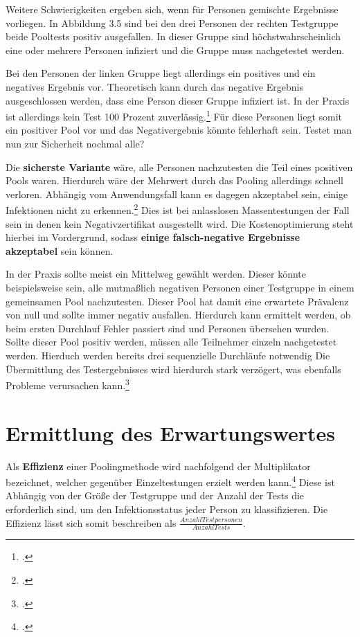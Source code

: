 Weitere Schwierigkeiten ergeben sich, wenn für Personen gemischte Ergebnisse vorliegen.
In Abbildung 3.5 sind bei den drei Personen der rechten Testgruppe beide Pooltests positiv ausgefallen.
In dieser Gruppe sind höchstwahrscheinlich eine oder mehrere Personen infiziert und die Gruppe muss nachgetestet werden.

Bei den Personen der linken Gruppe liegt allerdings ein positives und ein negatives Ergebnis vor.
Theoretisch kann durch das negative Ergebnis ausgeschlossen werden, dass eine Person dieser Gruppe infiziert ist.
In der Praxis ist allerdings kein Test 100 Prozent zuverlässig.\footcite{verwilt_evaluation_2021}
Für diese Personen liegt somit ein positiver Pool vor und das Negativergebnis könnte fehlerhaft sein.
Testet man nun zur Sicherheit nochmal alle?

Die \textbf{sicherste Variante} wäre, alle Personen nachzutesten die Teil eines positiven Pools waren.
Hierdurch wäre der Mehrwert durch das Pooling allerdings schnell verloren.
Abhängig vom Anwendungsfall kann es dagegen akzeptabel sein, einige Infektionen nicht zu erkennen.\footcite{weishampel_orasure_2022}
Dies ist bei anlasslosen Massentestungen der Fall sein in denen kein Negativzertifikat ausgestellt wird.
Die Kostenoptimierung steht hierbei im Vordergrund, sodass \textbf{einige falsch-negative Ergebnisse akzeptabel} sein können. 

In der Praxis sollte meist ein Mittelweg gewählt werden.
Dieser könnte beispielsweise sein, alle mutmaßlich negativen Personen einer Testgruppe in einem gemeinsamen Pool nachzutesten.
Dieser Pool hat damit eine erwartete Prävalenz von null und sollte immer negativ ausfallen.
Hierdurch kann ermittelt werden, ob beim ersten Durchlauf Fehler passiert sind und Personen übersehen wurden.
Sollte dieser Pool positiv werden, müssen alle Teilnehmer einzeln nachgetestet werden.
Hierduch werden bereits drei sequenzielle Durchläufe notwendig
Die Übermittlung des Testergebnisses wird hierdurch stark verzögert, was ebenfalls Probleme verursachen kann.\footcite{viehweger_increased_2020}

\section{Ermittlung des Erwartungswertes}
Als \textbf{Effizienz} einer Poolingmethode wird nachfolgend der Multiplikator bezeichnet, welcher gegenüber Einzeltestungen erzielt werden kann.\footcite{viehweger_increased_2020}
Diese ist Abhängig von der Größe der Testgruppe und der Anzahl der Tests die erforderlich sind, um den Infektionsstatus jeder Person zu klassifizieren.
Die Effizienz lässt sich somit beschreiben als $\frac{Anzahl Testpersonen}{Anzahl Tests} $.

